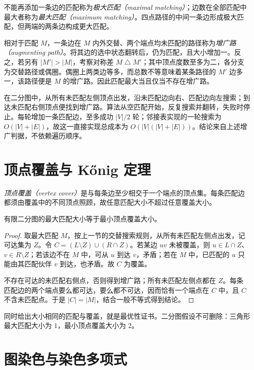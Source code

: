 不能再添加一条边的匹配称为\emph{极大匹配（maximal matching）}；边数在全部匹配中最大者称为\emph{最大匹配（maximum matching）}。四点路径的中间一条边形成极大匹配，但两端的两条边构成更大匹配。

相对于匹配 $M$，一条边在 $M$ 内外交替、两个端点均未匹配的路径称为\emph{增广路（augmenting path）}。将其边的选中状态翻转后，仍为匹配，且大小增加一。反之，若另有 $|M'|>|M|$，考察对称差 $M\mathbin{\triangle}M'$；其中顶点度数至多为二，各分支为交替路径或偶圈。偶圈上两类边等多，而总数不等意味着某条路径的 $M'$ 边多一，该路径便是 $M$ 的增广路。因此匹配最大当且仅当不存在增广路。

在二分图中，从所有未匹配左侧顶点出发，沿未匹配边向右、匹配边向左搜索；到达未匹配右侧顶点便找到增广路。算法从空匹配开始，反复搜索并翻转，失败时停止。每轮增加一条匹配边，至多成功 $|V|/2$ 轮；邻接表实现的一轮搜索为 $O(|V|+|E|)$，故这一直接实现总成本为 $O(|V|(|V|+|E|))$。结论来自上述增广判据，不依赖遍历顺序。

\section{顶点覆盖与 K\H{o}nig 定理}

\emph{顶点覆盖（vertex cover）}是与每条边至少相交于一个端点的顶点集。每条匹配边都须由覆盖中的不同顶点照顾，故任意匹配大小不超过任意覆盖大小。

\begin{theorem}[K\H{o}nig 定理]
有限二分图的最大匹配大小等于最小顶点覆盖大小。
\end{theorem}
\begin{proof}
取最大匹配 $M$，按上一节的交替搜索规则，从所有未匹配左侧点出发，记可达集为 $Z$。令 $C=(L\setminus Z)\cup(R\cap Z)$。若某边 $uv$ 未被覆盖，则 $u\in L\cap Z$、$v\in R\setminus Z$；若该边不在 $M$ 中，可从 $u$ 到达 $v$，矛盾；若在 $M$ 中，已匹配的 $u$ 只能由其匹配伙伴 $v$ 到达，也矛盾。故 $C$ 为覆盖。

不存在可达的未匹配右侧点，否则得到增广路；所有未匹配左侧点都在 $Z$。每条匹配边的两个端点要么都可达，要么都不可达，因而恰有一个端点在 $C$ 中，且 $C$ 不含未匹配点。于是 $|C|=|M|$，结合一般不等式得到结论。
\end{proof}

同时给出大小相同的匹配与覆盖，就是最优性证书。二分图假设不可删除：三角形最大匹配大小为 $1$，最小顶点覆盖大小为 $2$。

\section{图染色与染色多项式}

